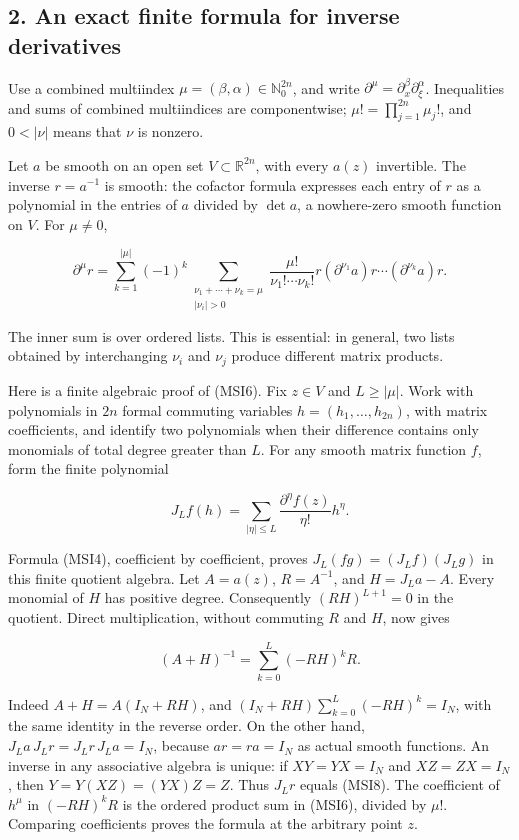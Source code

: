 \documentclass[
  11pt,
]{article}
\begin{document}
\subsection{2. An exact finite formula for inverse
derivatives}\label{an-exact-finite-formula-for-inverse-derivatives}

Use a combined multiindex \(\mu=(\beta,\alpha)\in\mathbb N_0^{2n}\), and
write \(\partial^\mu=\partial_x^\beta\partial_\xi^\alpha\). Inequalities
and sums of combined multiindices are componentwise;
\(\mu!=\prod_{j=1}^{2n}\mu_j!\), and \(0<|\nu|\) means that \(\nu\) is
nonzero.

Let \(a\) be smooth on an open set \(V\subset\mathbb R^{2n}\), with
every \(a(z)\) invertible. The inverse \(r=a^{-1}\) is smooth: the
cofactor formula expresses each entry of \(r\) as a polynomial in the
entries of \(a\) divided by \(\det a\), a nowhere-zero smooth function
on \(V\). For \(\mu\ne0\),

\[
\partial^\mu r
=\sum_{k=1}^{|\mu|}(-1)^k
 \sum_{\substack{\nu_1+\cdots+\nu_k=\mu\\|\nu_i|>0}}
 \frac{\mu!}{\nu_1!\cdots\nu_k!}
 r(\partial^{\nu_1}a)r\cdots
   (\partial^{\nu_k}a)r.
\tag{MSI6}
\]

The inner sum is over ordered lists. This is essential: in general, two
lists obtained by interchanging \(\nu_i\) and \(\nu_j\) produce
different matrix products.

Here is a finite algebraic proof of (MSI6). Fix \(z\in V\) and
\(L\geq|\mu|\). Work with polynomials in \(2n\) formal commuting
variables \(h=(h_1,\ldots,h_{2n})\), with matrix coefficients, and
identify two polynomials when their difference contains only monomials
of total degree greater than \(L\). For any smooth matrix function
\(f\), form the finite polynomial

\[
J_Lf(h)=\sum_{|\eta|\leq L}
 \frac{\partial^\eta f(z)}{\eta!}h^\eta.
\tag{MSI7}
\]

Formula (MSI4), coefficient by coefficient, proves
\(J_L(fg)=(J_Lf)(J_Lg)\) in this finite quotient algebra. Let
\(A=a(z)\), \(R=A^{-1}\), and \(H=J_La-A\). Every monomial of \(H\) has
positive degree. Consequently \((RH)^{L+1}=0\) in the quotient. Direct
multiplication, without commuting \(R\) and \(H\), now gives

\[
(A+H)^{-1}
=\sum_{k=0}^{L}(-RH)^kR.
\tag{MSI8}
\]

Indeed \(A+H=A(I_N+RH)\), and \((I_N+RH)\sum_{k=0}^{L}(-RH)^k=I_N\),
with the same identity in the reverse order. On the other hand,
\(J_La\,J_Lr=J_Lr\,J_La=I_N\), because \(ar=ra=I_N\) as actual smooth
functions. An inverse in any associative algebra is unique: if
\(XY=YX=I_N\) and \(XZ=ZX=I_N\), then \(Y=Y(XZ)=(YX)Z=Z\). Thus \(J_Lr\)
equals (MSI8). The coefficient of \(h^\mu\) in \((-RH)^kR\) is the
ordered product sum in (MSI6), divided by \(\mu!\). Comparing
coefficients proves the formula at the arbitrary point \(z\).
\end{document}
